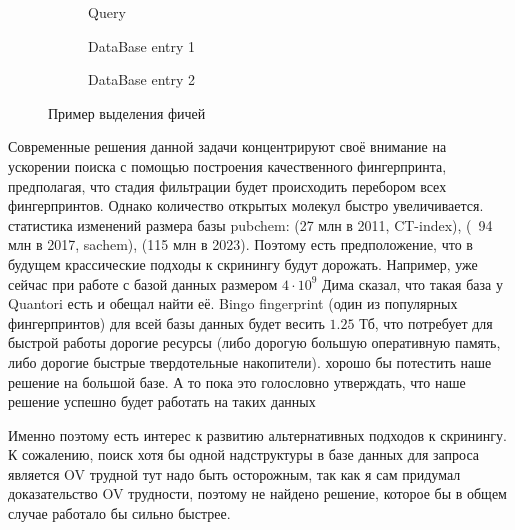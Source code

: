 \begin{figure}
  \centering

  \begin{subfigure}[h]{0.3\textwidth}
     \caption{Query}
     \label{figure:features_example:2}
  \end{subfigure}
  \begin{subfigure}[h]{0.3\textwidth}
     \caption{DataBase entry 1}
     \label{figure:features_example:0}
  \end{subfigure}
  \begin{subfigure}[h]{0.3\textwidth}
     \caption{DataBase entry 2}
     \label{figure:features_example:1}
  \end{subfigure}

  \caption{Пример выделения фичей}
  \label{figure:features_example}

\end{figure}


Современные решения данной задачи концентрируют своё внимание на ускорении поиска с помощью построения качественного фингерпринта, предполагая, что стадия фильтрации будет происходить перебором всех фингерпринтов. Однако количество открытых молекул быстро увеличивается. {\color{red} статистика изменений размера базы pubchem: (27 млн в 2011, CT-index), (~94 млн в 2017, sachem), (115 млн в 2023)}. Поэтому есть предположение, что в будущем крассические подходы к скринингу будут дорожать.  Например, уже сейчас при работе с базой данных размером $4 \cdot 10^9$ {\color{red} Дима сказал, что такая база у Quantori есть и обещал найти её}. Bingo fingerprint (один из популярных фингерпринтов) для всей базы данных будет весить $1.25$ Тб, что потребует для быстрой работы дорогие ресурсы (либо дорогую большую оперативную память, либо дорогие быстрые твердотельные накопители). {\color{red} хорошо бы потестить наше решение на большой базе. А то пока это голословно утверждать, что наше решение успешно будет работать на таких данных}

Именно поэтому есть интерес к развитию альтернативных подходов к скринингу. К сожалению, поиск хотя бы одной надструктуры в базе данных для запроса является OV трудной {\color{red} тут надо быть осторожным, так как я сам придумал доказательство OV трудности}, поэтому не найдено решение, которое бы в общем случае работало бы сильно быстрее.

